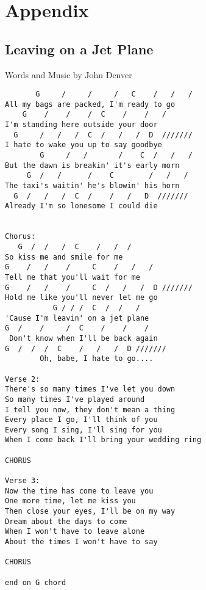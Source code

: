 \chapter{Appendix}
\section{Leaving on a Jet Plane} \label{sec:song1}
Words and Music by John Denver
\begin{verbatim}
       G     /     /     /   C    /   /   /
All my bags are packed, I'm ready to go
    G    /    /    /  C    /    /   /
I'm standing here outside your door
  G     /   /   /  C  /   /   /  D  ///////
I hate to wake you up to say goodbye
        G     /   /       /    C  /   /   /
But the dawn is breakin' it's early morn
     G  /   /      /    C        /   /   /
The taxi's waitin' he's blowin' his horn
  G  /   /   /  C  /    /   /   D  ///////
Already I'm so lonesome I could die


Chorus:
   G  /  /   /  C    /   /  /  
So kiss me and smile for me 
G    /   /    /     C    /   /   /
Tell me that you'll wait for me
G    /   /    /     C  /   /   /  D ///////
Hold me like you'll never let me go
           G / / /  C  /  /   /  
'Cause I'm leavin' on a jet plane
G  /    /     /  C    /    /    /  
 Don't know when I'll be back again
G  /  /  /  C    /   /   /  D ///////
        Oh, babe, I hate to go....

Verse 2:
There's so many times I've let you down
So many times I've played around
I tell you now, they don't mean a thing
Every place I go, I'll think of you
Every song I sing, I'll sing for you
When I come back I'll bring your wedding ring

CHORUS

Verse 3:
Now the time has come to leave you
One more time, let me kiss you
Then close your eyes, I'll be on my way
Dream about the days to come
When I won't have to leave alone
About the times I won't have to say

CHORUS

end on G chord
\end{verbatim}

